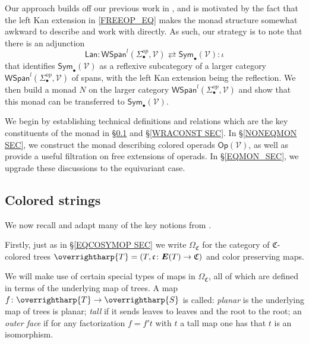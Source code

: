 \documentclass[a4paper,10pt
,draft
]{article}%
\numberwithin{equation}{section}
\numberwithin{figure}{section}
\theoremstyle{definition} %
\newcommand{\vect}[1]{\text{\overrightharp{\ensuremath{#1}}}}
\newcommand{\Op}{\mathsf{Op}}%
\newcommand{\V}{\ensuremath{\mathcal V}}
\newcommand{\1}{\ensuremath{\mathbbm 1}}%
\begin{document}
Our approach builds off our previous work in \cite{BP_geo},
and is motivated by the fact that the left Kan extension in \eqref{FREEOP_EQ} makes the monad structure somewhat awkward to describe and work with directly.
As such, our strategy is to note that there is an adjunction 
\begin{equation}\label{SPANSYMADJ EQ}
\mathsf{Lan} \colon
\mathsf{WSpan}^l(\Sigma_{\bullet}^{op},\mathcal{V}) 
	\rightleftarrows
\mathsf{Sym}_{\bullet}(\mathcal{V})
\colon \iota
\end{equation}
that identifies $\mathsf{Sym}_{\bullet}(\V)$ 
as a reflexive subcategory of a larger category 
$\mathsf{WSpan}^l(\Sigma_{\bullet}^{op},\mathcal{V})$
of spans, with the left Kan extension being the reflection.
We then build a monad $N$ on the larger category 
$\mathsf{WSpan}^l(\Sigma_{\bullet}^{op},\mathcal{V})$
and show that this monad can be transferred to 
$\mathsf{Sym}_{\bullet}(\mathcal{V})$.




We begin by establishing technical definitions and relations which are the key constituents of the monad in \S \ref{CSTRINGS_SEC} and \S \ref{WRACONST SEC}.
In \S \ref{NONEQMON SEC}, we construct the monad describing colored operads $\Op(\V)$, as well as provide a useful filtration on free extensions of operads.
In \S \ref{EQMON_SEC}, we upgrade these discussions to the equivariant case.





\subsection{Colored strings}
\label{CSTRINGS_SEC}


We now recall and adapt many 
of the key notions from \cite{BP_geo}.

Firstly, just as in \S \ref{EQCOSYMOP SEC}
we write 
$\Omega_{\mathfrak{C}}$
for the category of 
$\mathfrak{C}$-colored trees
$\vect{T} = (T,\mathfrak{c}\colon \boldsymbol{E}(T) \to \mathfrak{C})$
and color preserving maps.

We will make use of certain special types of maps in $\Omega_{\mathfrak{C}}$, all of which are defined in terms of the underlying map of trees.
A map $f \colon \vect{T} \to \vect{S}$
is called:
\emph{planar} is the underlying map of trees is planar;
\emph{tall} if it sends leaves to leaves and the root to the root;
an \emph{outer face}
if for any factorization 
$f = f' t$ with $t$ a tall map one has that $t$ is an isomorphism. 
\end{document}
